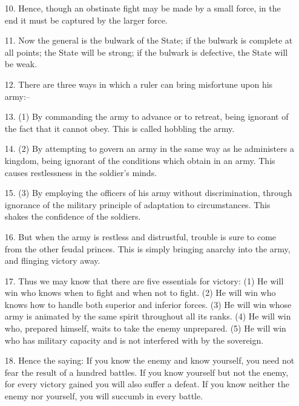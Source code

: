 \documentclass[11pt,openany]{memoir}
\newcommand{\enumeratemargin}{1.30em}
\begin{document}
\begin{enumerate}[leftmargin=\enumeratemargin]
\item[10.] Hence, though an obstinate fight may be made by a small force, in the end it must be captured by the larger force.
\item[11.] Now the general is the bulwark of the State; if the bulwark is complete at all points; the State will be strong; if the bulwark is defective, the State will be weak.
\item[12.] There are three ways in which a ruler can bring misfortune upon his army:--
\item[13.] (1) By commanding the army to advance or to retreat, being ignorant of the fact that it cannot obey. This is called hobbling the army.
\item[14.] (2) By attempting to govern an army in the same way as he administers a kingdom, being ignorant of the conditions which obtain in an army. This causes restlessness in the soldier's minds.
\item[15.] (3) By employing the officers of his army without discrimination, through ignorance of the military principle of adaptation to circumstances. This shakes the confidence of the soldiers.
\item[16.] But when the army is restless and distrustful, trouble is sure to come from the other feudal princes. This is simply bringing anarchy into the army, and flinging victory away.
\item[17.] Thus we may know that there are five essentials for victory: (1) He will win who knows when to fight and when not to fight. (2) He will win who knows how to handle both superior and inferior forces. (3) He will win whose army is animated by the same spirit throughout all its ranks. (4) He will win who, prepared himself, waits to take the enemy unprepared. (5) He will win who has military capacity and is not interfered with by the sovereign.
\item[18.] Hence the saying: If you know the enemy and know yourself, you need not fear the result of a hundred battles. If you know yourself but not the enemy, for every victory gained you will also suffer a defeat. If you know neither the enemy nor yourself, you will succumb in every battle.
\end{enumerate}
\end{document}
